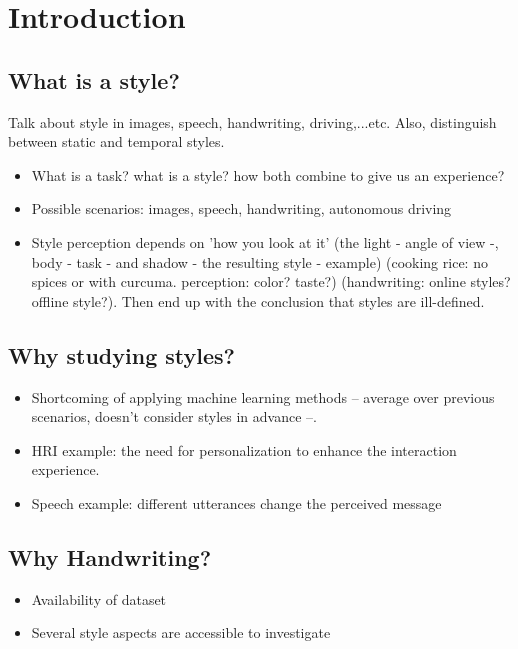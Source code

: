 \chapter{Introduction}

\section{What is a style?}\label{sec:style}
Talk about style in images, speech, handwriting, driving,...etc. Also, distinguish between static and temporal styles.
\begin{itemize}[noitemsep]
    \item What is a task? what is a style? how both combine to give us an experience?
    \item Possible scenarios: images, speech, handwriting, autonomous driving
    \item Style perception depends on 'how you look at it' (the light - angle of view -, body - task - and shadow - the resulting style - example) (cooking rice: no spices or with curcuma. perception: color? taste?) (handwriting: online styles? offline style?). Then end up with the conclusion that styles are ill-defined.
\end{itemize}

\section{Why studying styles?}
\begin{itemize}[noitemsep]
    \item Shortcoming of applying machine learning methods -- average over previous scenarios, doesn't consider styles in advance --.
    \item HRI example: the need for personalization to enhance the interaction experience.
    \item Speech example: different utterances change the perceived message
\end{itemize}

\section{Why Handwriting?}
\begin{itemize}[noitemsep]
    \item Availability of dataset
    \item Several style aspects are accessible to investigate
\end{itemize}

